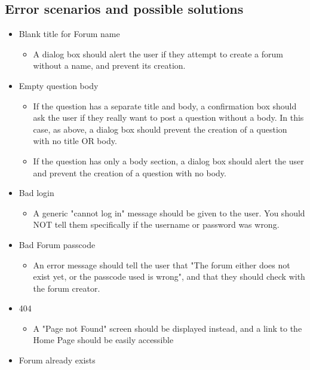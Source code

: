 \documentclass[12pt]{article}
\begin{document}
\subsection{Error scenarios and possible solutions}
    \begin{itemize}
        \item Blank title for Forum name
            \begin{itemize}
                \item A dialog box should alert the user if they attempt to create a forum without a name, and prevent its creation.
            \end{itemize}
        \item Empty question body
            \begin{itemize}
                \item If the question has a separate title and body, a confirmation box should ask the user if they really want to post a question without a body. In this case, as above, a dialog box should prevent the creation of a question with no title OR body.
                \item If the question has only a body section, a dialog box should alert the user and prevent the creation of a question with no body.
            \end{itemize}
        \item Bad login
            \begin{itemize}
                \item A generic "cannot log in" message should be given to the user. You should NOT tell them specifically if the username or password was wrong.
            \end{itemize}
        \item Bad Forum passcode
            \begin{itemize}
                \item An error message should tell the user that "The forum either does not exist yet, or the passcode used is wrong", and that they should check with the forum creator.
            \end{itemize}
        \item 404
            \begin{itemize}
                \item A "Page not Found" screen should be displayed instead, and a link to the Home Page should be easily accessible
            \end{itemize}
        \item Forum already exists

\end{itemize}
\end{document}
